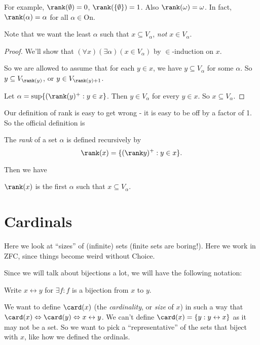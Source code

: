 \documentclass[a4paper]{article}
\begin{document}
For example, $\rank(\emptyset) = 0$, $\rank(\{\emptyset\}) = 1$. Also $\rank(\omega) = \omega$. In fact, $\rank(\alpha) = \alpha$ for all $\alpha\in \mathrm{On}$.

Note that we want the least $\alpha$ such that $x\subseteq V_\alpha$, \emph{not} $x\in V_\alpha$.

\begin{proof}
  We'll show that $(\forall x)(\exists \alpha)(x\in V_\alpha)$ by $\in$-induction on $x$.

  So we are allowed to assume that for each $y\in x$, we have $y\subseteq V_\alpha$ for some $\alpha$. So $y\subseteq V_{\rank(y)}$, or $y\in V_{\rank(y) + 1}$.

  Let $\alpha = \sup\{(\rank(y)^+: y\in x\}$. Then $y\in V_\alpha$ for every $y\in x$. So $x\subseteq V_\alpha$.
\end{proof}

Our definition of rank is easy to get wrong - it is easy to be off by a factor of 1. So the official definition is
\begin{defi}[Rank]
  The \emph{rank} of a set $\alpha$ is defined recursively by
  \[
    \rank(x) = \{(\rank y)^+ : y\in x\}.
  \]
\end{defi}

Then we have
\begin{prop}
  $\rank(x)$ is the first $\alpha$ such that $x\subseteq V_\alpha$.
\end{prop}

\section{Cardinals}
Here we look at ``sizes'' of (infinite) sets (finite sets are boring!). Here we work in ZFC, since things become weird without Choice.

Since we will talk about bijections a lot, we will have the following notation:
\begin{notation}
  Write $x\leftrightarrow y$ for $\exists f: f$ is a bijection from $x$ to $y$.
\end{notation}

We want to define $\card(x)$ (the \emph{cardinality}, or \emph{size} of $x$) in such a way that $\card(x) \Leftrightarrow \card(y) \Leftrightarrow x\leftrightarrow y$. We can't define $\card(x) = \{y: y\leftrightarrow x\}$ as it may not be a set. So we want to pick a ``representative'' of the sets that biject with $x$, like how we defined the ordinals.
\end{document}
